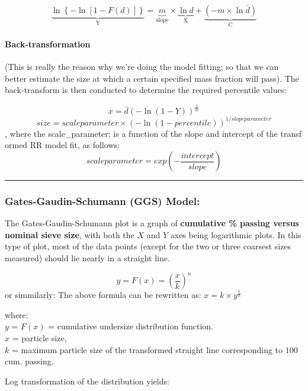 \documentclass[
]{article}
\begin{document}
\[\underbrace{\ln\left\{-\ln\left[1-F(d)\right] \right\}}_\textrm{Y} =  \underbrace{m}_\textrm{slope}\times \underbrace{\ln d}_\textrm{X}+\underbrace{ \left(-m\times \ln \bar{d}\right)}_\textrm{C} \]

\hypertarget{back-transformation}{%
\paragraph{Back-transformation}\label{back-transformation}}

(This is really the reason why we're doing the model fitting; so that we
can better estimate the size at which a certain specified mass fraction
will pass). The back-transform is then conducted to determine the
required percentile values:

\[ x = \bar{d} \left(- \ln \left(1-Y \right)    \right)^\frac{1}{m}\]
\[size = scale parameter\times (-\ln (1-percentile))^{1/slope parameter}\]
, where the scale\_parameter; is a function of the slope and intercept
of the transf ormed RR model fit, as follows:
\[scale parameter = exp(-\frac{intercept}{slope} )\]

\begin{center}\rule{0.5\linewidth}{0.5pt}\end{center}

\hypertarget{gates-gaudin-schumann-ggs-model}{%
\subsubsection{Gates-Gaudin-Schumann (GGS)
Model:}\label{gates-gaudin-schumann-ggs-model}}

The Gates-Gaudin-Schumann plot is a graph of \textbf{cumulative \%
passing versus nominal sieve size}, with both the \(X\) and \(Y\) axes
being logarithmic plots. In this type of plot, most of the data points
(except for the two or three coarsest sizes measured) should lie nearly
in a straight line.

\[y = F(x) = \left(\frac{x}{k}\right) ^n\] or simmilarly: The above
formula can be rewritten as: \(x = k \times y ^ \frac{1}{n}\)

where:\\
\(y\) = \(F \left(x\right)\) = cumulative undersize distribution
function.\\
\(x\) = particle size,\\
\(k\) = maximum particle size of the transformed straight line
corresponding to \(100%
\) cum. passing.

Log transformation of the distribution yields:
\end{document}
